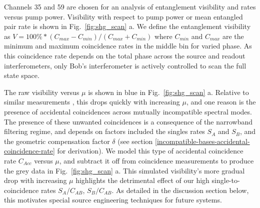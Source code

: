 \documentclass[11pt]{caltech_thesis} %
\begin{document}
Channels 35 and 59 are chosen for an analysis of entanglement visibility and rates versus pump power. Visibility with respect to pump power or mean entangled pair rate is shown in Fig.~\ref{fig:shg_scan} a. We define the entanglement visibility as $V = 100\%*(C_{max} - C_{min})/(C_{max} + C_{min})$ where $C_{min}$ and $C_{max}$ are the minimum and maximum coincidence rates in the middle bin for varied phase. As this coincidence rate depends on the total phase across the source and readout interferometers, only Bob's interferometer is actively controlled to scan the full state space.

The raw visibility versus $\mu$ is shown in blue in Fig.~\ref{fig:shg_scan} a. Relative to similar measurements \autocite{Kim2022}, this drops quickly with increasing $\mu$, and one reason is the presence of accidental coincidences across mutually incompatible spectral modes. The presence of these unwanted coincidences is a consequence of the narrowband filtering regime, and depends on factors included the singles rates $S_A$ and $S_B$, and the geometric compensation factor $\delta$ (see section \ref{incompatible-bases-accidental-coincidence-rate} for derivation). We model this type of accidental coincidence rate $C_{Acc}$ versus $\mu$, and subtract it off from coincidence measurements to produce the grey data in Fig.~\ref{fig:shg_scan} a. This simulated visibility's more gradual drop with increasing $\mu$ highlights the detrimental effect of our high single-to-coincidence rates $S_A/C_{AB}$, $S_B/C_{AB}$. As detailed in the discussion section below, this motivates special source engineering techniques for future systems.
\end{document}
